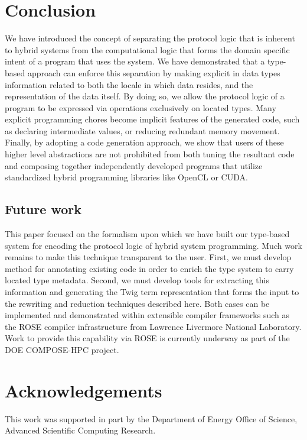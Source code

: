 
\section{Conclusion}

We have introduced the concept of separating the protocol logic that is inherent
to hybrid systems from the computational logic that forms the domain specific
intent of a program that uses the system. We have demonstrated that a type-based
approach can enforce this separation by making explicit in data types
information related to both the locale in which data resides, and the
representation of the data itself. By doing so, we allow the protocol logic of a
program to be expressed via operations exclusively on located types. Many
explicit programming chores become implicit features of the generated code, such
as declaring intermediate values, or reducing redundant memory movement.
Finally, by adopting a code generation approach, we show that users of these
higher level abstractions are not prohibited from both tuning the resultant code
and composing together independently developed programs that utilize
standardized hybrid programming libraries like OpenCL or CUDA.

\subsection{Future work}

This paper focused on the formalism upon which we have built our type-based
system for encoding the protocol logic of hybrid system programming. Much work
remains to make this technique transparent to the user. First, we must develop
method for annotating existing code in order to enrich the type system to carry
located type metadata. Second, we must develop tools for extracting this
information and generating the Twig term representation that forms the input to
the rewriting and reduction techniques described here. Both cases can be
implemented and demonstrated within extensible compiler frameworks such as the
ROSE compiler infrastructure from Lawrence Livermore National Laboratory. Work
to provide this capability via ROSE is currently underway as part of the DOE
COMPOSE-HPC project.

\section{Acknowledgements}

This work was supported in part by the Department of Energy Office of Science,
Advanced Scientific Computing Research.
